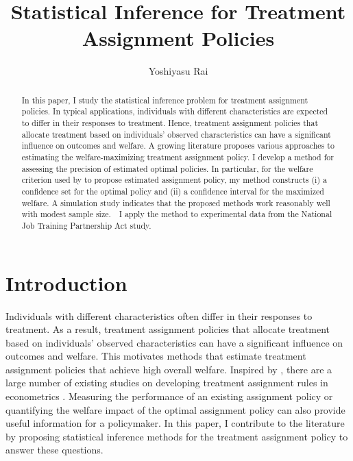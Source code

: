 \documentclass[12pt,oneside,reqno,english]{amsart}
\makeatletter
\newcommand{\reqnomode}{\tagsleft@false}
\theoremstyle{definition}
\makeatother
\begin{document}

\reqnomode

\title{Statistical Inference for Treatment Assignment Policies} 

\author{Yoshiyasu Rai}

\address{Department of Economics, University of Wisconsin-Madison, 1180 Observatory
Drive, Madison, WI 53706, USA.}


\begin{abstract}
In this paper, I study the statistical inference problem for treatment assignment policies. In typical applications, individuals with different characteristics are expected to differ in their responses to treatment. Hence, treatment assignment policies that allocate treatment based on individuals' observed characteristics can have a significant influence on outcomes and welfare. 
A growing literature proposes various approaches to estimating the welfare-maximizing treatment assignment policy. I develop a method for assessing the precision of estimated optimal policies. In particular, for the welfare criterion used by \cite{KT:18} to propose estimated assignment policy, my method constructs (i) a confidence set for the optimal policy and (ii) a confidence interval for the maximized welfare. A simulation study indicates that the proposed methods work reasonably well with modest sample size.　I apply the method to experimental data from the National Job Training Partnership Act study.
\end{abstract}
\maketitle

\section{Introduction}
Individuals with different characteristics often differ in their responses to treatment. 
As a result, treatment assignment policies that allocate treatment based on individuals' observed characteristics can have a significant influence on outcomes and welfare. 
This motivates methods that estimate treatment assignment policies that achieve high overall welfare. 
 Inspired by \cite{Manski:04}, there are a large number of existing studies on developing treatment assignment rules in econometrics 
 \citep{Dehejia:05, Stoye:09, Stoye:12, HP:09, Chamberlain:11, BD:12,Tetenov:12, Kasy:14,Kasy:16,KT:17, KT:18,MT:16, AW:17, MT:18}.
Measuring the performance of an existing assignment policy or quantifying the welfare impact of the optimal assignment policy 
can also provide useful information for a policymaker. 
In this paper, I contribute to the literature by proposing statistical inference methods for the treatment assignment policy to answer these questions. 
\end{document}
